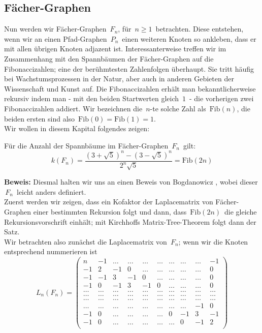 \subsection{Fächer-Graphen}
Nun werden wir Fächer-Graphen $\,F_n$,\; für $\,n \geq 1\,$ betrachten. Diese entstehen, wenn wir an einen Pfad-Graphen $\,P_{n}\,$ einen weiteren Knoten so ankleben, dass er mit allen übrigen Knoten adjazent ist. Interessanterweise treffen wir im Zusammenhang mit den Spannbäumen der Fächer-Graphen auf die  Fibonaccizahlen; eine der berühmtesten Zahlenfolgen überhaupt. Sie tritt häufig bei Wachstumsprozessen in der Natur, aber auch in anderen Gebieten der Wissenschaft und Kunst auf. Die Fibonaccizahlen erhält man bekanntlicherweise rekursiv indem man - mit den  beiden Startwerten gleich $\,1\,$ - die vorherigen zwei Fibonaccizahlen addiert. Wir bezeichnen die $\,n$-te solche Zahl als $\,\mathrm{Fib}(n)$,\; die beiden ersten sind also $\,\mathrm{Fib}(0)=\mathrm{Fib}(1)=1$.\;\\
Wir wollen in diesem Kapital folgendes zeigen:
\begin{Tms}
 Für die Anzahl der Spannbäume im Fächer-Graphen $\,F_n\,$ gilt:
 \begin{equation*}
  \mathit{k}(F_n)=\frac{(3+\sqrt{5})^{n}-(3-\sqrt{5})^{n}}{2^{n}\sqrt{5}}=\mathrm{Fib}(2n)
 \end{equation*}
 \label{ThmFn}
\end{Tms}
\textbf{Beweis:}
Diesmal halten wir uns an einen Beweis von Bogdanowicz \cite{bogdanowicz_2008}, wobei dieser $\,F_n\,$ leicht anders definiert.\\
Zuerst werden wir zeigen, dass ein Kofaktor der Laplacematrix von Fächer-Graphen einer bestimmten Rekursion folgt und dann, dass $\,\mathrm{Fib}(2n)\,$ die gleiche Rekursionsvorschrift einhält; mit Kirchhoffs Matrix-Tree-Theorem folgt dann der Satz.\\
Wir betrachten also zunächst die Laplacematrix von $\,F_n$; wenn wir die Knoten entsprechend nummerieren ist\\
\begin{equation*}
L_n(F_n)=
\begin{pmatrix}
n&-1&\ldots&\ldots&\ldots&\ldots&\ldots&\ldots&\ldots&-1\\
-1&2&-1&0&\ldots&\ldots&\ldots&\ldots&\ldots&0\\
-1&-1&3&-1&0&\ldots&\ldots&\ldots&\ldots&0\\
-1&0&-1&3&-1&0&\ldots&\ldots&\ldots&0\\
\ldots&\ldots&\ldots&\ldots&\ldots&\ldots&\ldots&\ldots&\ldots&\ldots\\
\ldots&\ldots&\ldots&\ldots&\ldots&\ldots&\ldots&\ldots&\ldots&\ldots\\
\ldots&\ldots&\ldots&\ldots&\ldots&\ldots&\ldots&\ldots&\ldots&\ldots\\
\ldots&\ldots&\ldots&\ldots&\ldots&\ldots&\ldots&\ldots&-1&0\\
-1&0&\ldots&\ldots&\ldots&\ldots&0&-1&3&-1\\
-1&0&\ldots&\ldots&\ldots&\ldots&\ldots&0&-1&2\\
\end{pmatrix}
\end{equation*}
